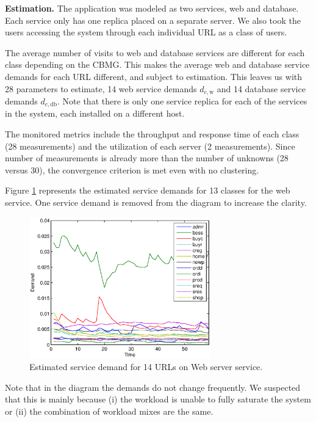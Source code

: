  \textbf{Estimation.} 
    The application was modeled as two services, web and database. Each service only has one replica placed on a separate server. We also took the users accessing the system through each individual URL as a class of users. 
    
		The average number of visits to web and database services are different for each class depending on the CBMG. This makes the average web and database service demands for each URL different, and subject to estimation. This leaves us with 28 parameters to estimate, 14 web service demands $d_{c,\text{w}}$ and 14 database service demands $d_{c,\text{db}}$. Note that there is only one service replica for each of the services in the system, each installed on a different host.
		
		The monitored metrics include the throughput and response time of each class (28 measurements) and the utilization of each server (2 measurements). Since number of measurements is already more than the number of unknowns (28 versus 30), the convergence criterion is met even with no clustering.

		Figure \ref{fig:estimated-demands-casestudy1} represents the estimated service demands for 13 classes for the web service. One service demand is removed from the diagram to increase the clarity. 
 \begin{figure}[htbp]
	\centering
	\includegraphics[width=0.7\textwidth]{image/demand13_estimated_kamlan.eps}
	\caption[A sample example of estimated service demand of 14 classes on a single service.]{Estimated service demand for 14 URLs on Web server service.}
	\label{fig:estimated-demands-casestudy1}
\end{figure}
Note that in the diagram the demands do not change frequently. We suspected that this is mainly because (i) the workload is unable to fully saturate the system or (ii) the combination of workload mixes are the same.
      
